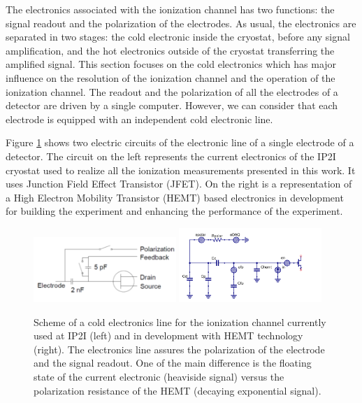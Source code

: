 
The electronics associated with the ionization channel has two functions: the signal readout and the polarization of the electrodes. As usual, the electronics are separated in two stages: the cold electronic inside the cryostat, before any signal amplification, and the hot electronics outside of the cryostat transferring the amplified signal. This section focuses on the cold electronics which has major influence on the resolution of the ionization channel and the operation of the ionization channel. The readout and the polarization of all the electrodes of a detector are driven by a single computer. However, we can  consider that each electrode is equipped with an independent cold electronic line.

Figure \ref{fig:electronics-scheme} shows two electric circuits of the electronic line of a single electrode of a detector. The circuit on the left represents the current electronics of the IP2I cryostat used to realize all the ionization measurements presented in this work. It uses Junction Field Effect Transistor (JFET). On the right is a representation of a High Electron Mobility Transistor (HEMT) based electronics in development for building the \Ricochet{} experiment \cite{Juillard:2019njs} and enhancing the performance of the \Edelweiss{} experiment.

\begin{figure}
\centering
\includegraphics[width=0.48\textwidth]{Figures/Electrodes/electronic_ion_ip2i.png}
\includegraphics[width=0.48\textwidth]{Figures/Electrodes/electronic_ion_hemt.png}
\caption{Scheme of a cold electronics line for the ionization channel currently used at IP2I (left) and in development with HEMT technology (right). The electronics line assures the polarization of the electrode and the signal readout. One of the main difference is the floating state of the current electronic (heaviside signal) versus the polarization resistance of the HEMT (decaying exponential signal).}
\label{fig:electronics-scheme}
\end{figure}

